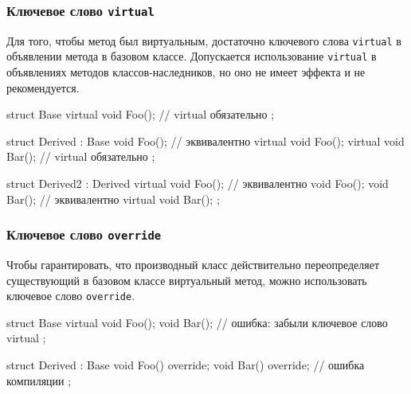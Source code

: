 \documentclass[compress, 8pt]{beamer}
\begin{document}
\begin{frame}[fragile]

    \frametitle{Ключевое слово \texttt{virtual}}

    \hfill\break
    Для того, чтобы метод был виртуальным, достаточно ключевого слова
    \verb|virtual|\footnotemark{} в объявлении метода в базовом классе.
    Допускается использование \verb|virtual| в объявлениях методов
    классов-наследников, но оно не имеет эффекта и не рекомендуется.


    \begin{myinplacelisting}[minted language=cpp]
struct Base {
    virtual void Foo(); // virtual обязательно
};

struct Derived : Base {
    void Foo(); // эквивалентно virtual void Foo();
    virtual void Bar(); // virtual обязательно
};

struct Derived2 : Derived {
    virtual void Foo(); // эквивалентно void Foo();
    void Bar(); // эквивалентно virtual void Bar();
};
    \end{myinplacelisting}

\end{frame}

\begin{frame}[fragile]

    \frametitle{Ключевое слово \texttt{override}}

    Чтобы гарантировать, что производный класс действительно переопределяет
    существующий в базовом классе виртуальный метод, можно использовать ключевое
    слово \texttt{override}\footnotemark{}.


    \begin{myinplacelisting}[minted language=cpp]
struct Base {
    virtual void Foo();
    void Bar(); // ошибка: забыли ключевое слово virtual
};

struct Derived : Base {
    void Foo() override;
    void Bar() override; // ошибка компиляции
};
    \end{myinplacelisting}

\end{frame}
\end{document}
